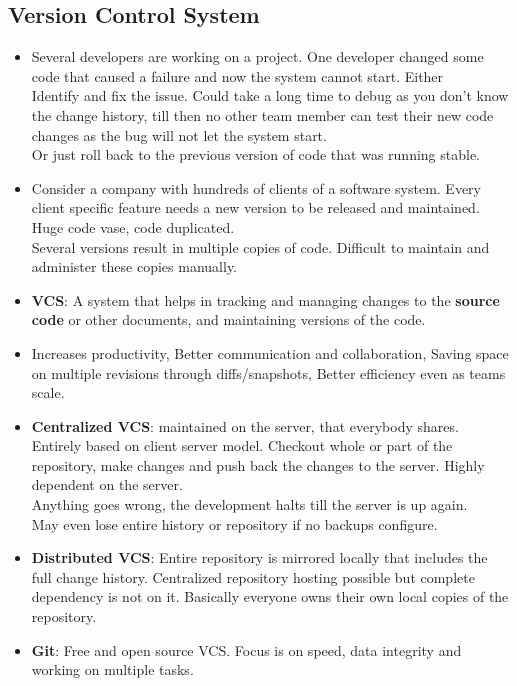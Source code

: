 \documentclass[a4paper]{article}
\begin{document}
\subsection{Version Control System}
\begin{itemize}
    \item Several developers are working on a project. One developer changed some code that caused a failure and now the system cannot start. Either\\
    Identify and fix the issue. Could take a long time to debug as you don't know the change history, till then no other team member can test their new code changes as the bug will not let the system start.\\
    Or just roll back to the previous version of code that was running stable.
    \item Consider a company with hundreds of clients of a software system. Every client specific feature needs a new version to be released and maintained.\\
    Huge code vase, code duplicated.\\
    Several versions result in multiple copies of code. Difficult to maintain and administer these copies manually.
    \item \textbf{VCS}: A system that helps in tracking and managing changes to the \textbf{source code} or other documents, and maintaining versions of the code.
    \item Increases productivity, Better communication and collaboration, Saving space on multiple revisions through diffs/snapshots, Better efficiency even as teams scale.
    \item \textbf{Centralized VCS}: maintained on the server, that everybody shares. Entirely based on client server model. Checkout whole or part of the repository, make changes and push back the changes to the server. Highly dependent on the server.\\
    Anything goes wrong, the development halts till the server is up again.\\
    May even lose entire history or repository if no backups configure.
    \item \textbf{Distributed VCS}: Entire repository is mirrored locally that includes the full change history. Centralized repository hosting possible but complete dependency is not on it. Basically everyone owns their own local copies of the repository.
    \item \textbf{Git}: Free and open source VCS. Focus is on speed, data integrity and working on multiple tasks.

\end{itemize}
\end{document}
